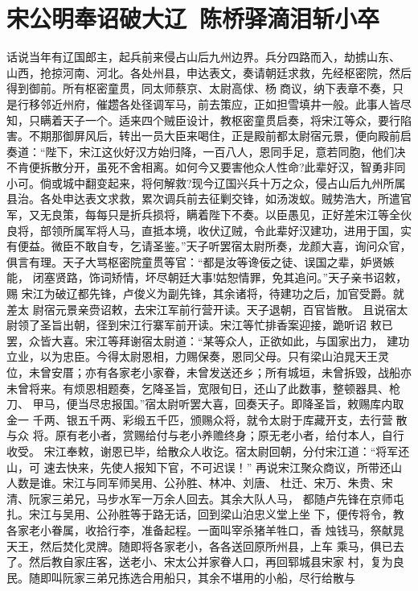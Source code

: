 \chapter{宋公明奉诏破大辽~陈桥驿滴泪斩小卒}

话说当年有辽国郎主，起兵前来侵占山后九州边界。兵分四路而入，劫掳山东、
山西，抢掠河南、河北。各处州县，申达表文，奏请朝廷求救，先经枢密院，然后
得到御前。所有枢密童贯，同太师蔡京、太尉高俅、杨商议，纳下表章不奏，只
是行移邻近州府，催趱各处径调军马，前去策应，正如担雪填井一般。此事人皆尽
知，只瞒着天子一个。适来四个贼臣设计，教枢密童贯启奏，将宋江等众，要行陷
害。不期那御屏风后，转出一员大臣来喝住，正是殿前都太尉宿元景，便向殿前启
奏道：“陛下，宋江这伙好汉方始归降，一百八人，恩同手足，意若同胞，他们决
不肯便拆散分开，虽死不舍相离。如何今又要害他众人性命?此辈好汉，智勇非同
小可。倘或城中翻变起来，将何解救?现今辽国兴兵十万之众，侵占山后九州所属
县治。各处申达表文求救，累次调兵前去征剿交锋，如汤泼蚁。贼势浩大，所遣官
军，又无良策，每每只是折兵损将，瞒着陛下不奏。以臣愚见，正好差宋江等全伙
良将，部领所属军将人马，直抵本境，收伏辽贼，令此辈好汉建功，进用于国，实
有便益。微臣不敢自专，乞请圣鉴。”天子听罢宿太尉所奏，龙颜大喜，询问众官，
俱言有理。天子大骂枢密院童贯等官：“都是汝等谗佞之徒、误国之辈，妒贤嫉能，
闭塞贤路，饰词矫情，坏尽朝廷大事!姑恕情罪，免其追问。”天子亲书诏敕，赐
宋江为破辽都先锋，卢俊义为副先锋，其余诸将，待建功之后，加官受爵。就差太
尉宿元景亲赍诏敕，去宋江军前行营开读。天子退朝，百官皆散。
且说宿太尉领了圣旨出朝，径到宋江行寨军前开读。宋江等忙排香案迎接，跪听诏
敕已罢，众皆大喜。宋江等拜谢宿太尉道：“某等众人，正欲如此，与国家出力，
建功立业，以为忠臣。今得太尉恩相，力赐保奏，恩同父母。只有梁山泊晁天王灵
位，未曾安厝；亦有各家老小家眷，未曾发送还乡；所有城垣，未曾拆毁，战船亦
未曾将来。有烦恩相题奏，乞降圣旨，宽限旬日，还山了此数事，整顿器具、枪刀、
甲马，便当尽忠报国。”宿太尉听罢大喜，回奏天子。即降圣旨，敕赐库内取金一
千两、银五千两、彩缎五千匹，颁赐众将，就令太尉于库藏开支，去行营散与众
将。原有老小者，赏赐给付与老小养赡终身；原无老小者，给付本人，自行收受。
宋江奉敕，谢恩已毕，给散众人收讫。宿太尉回朝，分付宋江道：“将军还山，可
速去快来，先使人报知下官，不可迟误！”
再说宋江聚众商议，所带还山人数是谁。宋江与同军师吴用、公孙胜、林冲、刘唐、
杜迁、宋万、朱贵、宋清、阮家三弟兄，马步水军一万余人回去。其余大队人马，
都随卢先锋在京师屯扎。宋江与吴用、公孙胜等于路无话，回到梁山泊忠义堂上坐
下，便传将令，教各家老小眷属，收拾行李，准备起程。一面叫宰杀猪羊牲口，香
烛钱马，祭献晁天王，然后焚化灵牌。随即将各家老小，各各送回原所州县，上车
乘马，俱已去了。然后教自家庄客，送老小、宋太公并家眷人口，再回郓城县宋家
村，复为良民。随即叫阮家三弟兄拣选合用船只，其余不堪用的小船，尽行给散与

